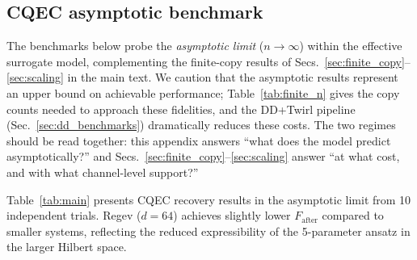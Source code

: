 \documentclass[pra,twocolumn,superscriptaddress,longbibliography,floatfix]{revtex4-2}
\begin{document}
\subsection{CQEC asymptotic benchmark}
\label{sec:main_results}

The benchmarks below probe the \emph{asymptotic limit} ($n \to \infty$) within the effective surrogate model, complementing the finite-copy results of Secs.~\ref{sec:finite_copy}--\ref{sec:scaling} in the main text.
We caution that the asymptotic results represent an upper bound on achievable performance; Table~\ref{tab:finite_n} gives the copy counts needed to approach these fidelities, and the DD+Twirl pipeline (Sec.~\ref{sec:dd_benchmarks}) dramatically reduces these costs.
The two regimes should be read together: this appendix answers ``what does the model predict asymptotically?'' and Secs.~\ref{sec:finite_copy}--\ref{sec:scaling} answer ``at what cost, and with what channel-level support?''

Table~\ref{tab:main} presents CQEC recovery results in the asymptotic limit from 10 independent trials.
Regev ($d = 64$) achieves slightly lower $F_\mathrm{after}$ compared to smaller systems, reflecting the reduced expressibility of the 5-parameter ansatz in the larger Hilbert space.
\end{document}
